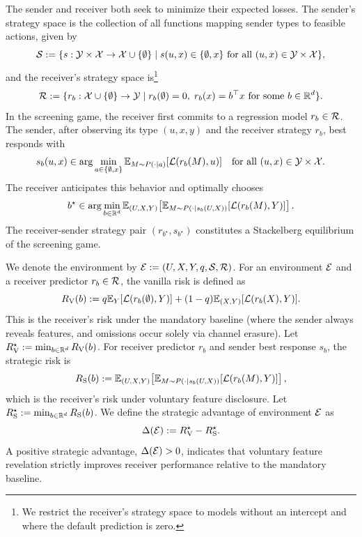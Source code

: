 The sender and receiver both seek to minimize their expected losses. The sender's strategy space is the collection of all functions mapping sender types to feasible actions, given by
\begin{equation*}
    \mathcal{S} := \{s: \mathcal{Y} \times \mathcal{X} \to \mathcal{X} \cup \{\emptyset\} \mid s(u,x) \in \{\emptyset, x\} \text{ for all } (u,x) \in \mathcal{Y} \times \mathcal{X}\},
\end{equation*}
and the receiver's strategy space is\footnote{We restrict the receiver's strategy space to models without an intercept and where the default prediction is zero.}
\begin{equation*}
    \mathcal{R} := \{r_b: \mathcal{X} \cup \{\emptyset\} \to \mathcal{Y} \mid r_b(\emptyset) = 0,\; r_b(x) = b^\top x \text{ for some } b \in \mathbb{R}^d\}.
\end{equation*}
In the screening game, the receiver first commits to a regression model $r_b \in \mathcal{R}$. The sender, after observing its type $(u,x,y)$ and the receiver strategy $r_b$, best responds with
\begin{equation*}
    s_b(u,x) \in \arg\min_{a \in \{\emptyset, x\}} \mathbb{E}_{M \sim P(\cdot \mid a)}[\mathcal{L}(r_b(M), u)] \quad \text{for all } (u,x) \in \mathcal{Y} \times \mathcal{X}.
\end{equation*}
The receiver anticipates this behavior and optimally chooses
\begin{equation*}
    b^\star \in \arg\min_{b \in \mathbb{R}^d} \mathbb{E}_{(U,X,Y)}\!\left[\mathbb{E}_{M \sim P(\cdot \mid s_b(U,X))}[\mathcal{L}(r_b(M), Y)]\right].
\end{equation*}
The receiver-sender strategy pair $(r_{b^\star}, s_{b^\star})$ constitutes a Stackelberg equilibrium of the screening game.

We denote the environment by $\mathcal{E} := (U,X,Y,q,\mathcal{S},\mathcal{R})$. For an environment $\mathcal{E}$ and a receiver predictor $r_b \in \mathcal{R}$, the vanilla risk is defined as
\begin{equation*}
    R_{\mathrm{V}}(b) := q \mathbb{E}_{Y}[\mathcal{L}(r_b(\emptyset), Y)] + (1-q) \mathbb{E}_{(X,Y)}[\mathcal{L}(r_b(X), Y)].
\end{equation*}
This is the receiver's risk under the mandatory baseline (where the sender always reveals features, and omissions occur solely via channel erasure). Let $R_{\mathrm{V}}^\star := \min_{b \in \mathbb{R}^d} R_{\mathrm{V}}(b)$. For receiver predictor $r_b$ and sender best response $s_b$, the strategic risk is
\begin{equation*}
    R_{\mathrm{S}}(b) := \mathbb{E}_{(U,X,Y)}\!\left[\mathbb{E}_{M \sim P(\cdot \mid s_b(U,X))}[\mathcal{L}(r_b(M), Y)]\right],
\end{equation*}
which is the receiver's risk under voluntary feature disclosure. Let $R_{\mathrm{S}}^\star := \min_{b \in \mathbb{R}^d} R_{\mathrm{S}}(b)$. We define the strategic advantage of environment $\mathcal{E}$ as
\begin{equation*}
    \Delta(\mathcal{E}) := R_{\mathrm{V}}^\star - R_{\mathrm{S}}^\star.
\end{equation*}
A positive strategic advantage, $\Delta(\mathcal{E}) > 0$, indicates that voluntary feature revelation strictly improves receiver performance relative to the mandatory baseline.

